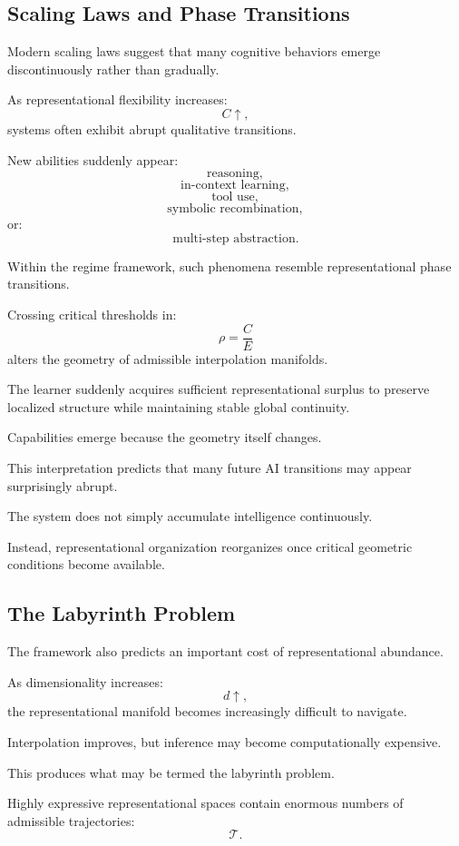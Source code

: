 \documentclass[12pt,a4paper]{article}
\begin{document}
\subsection{Scaling Laws and Phase Transitions}

Modern scaling laws suggest that many cognitive behaviors emerge discontinuously rather than gradually.

As representational flexibility increases:
\[
C
\uparrow,
\]
systems often exhibit abrupt qualitative transitions.

New abilities suddenly appear:
\[
\text{reasoning},
\]
\[
\text{in-context learning},
\]
\[
\text{tool use},
\]
\[
\text{symbolic recombination},
\]
or:
\[
\text{multi-step abstraction}.
\]

Within the regime framework, such phenomena resemble representational phase transitions.

Crossing critical thresholds in:
\[
\rho
=
\frac{C}{E}
\]
alters the geometry of admissible interpolation manifolds.

The learner suddenly acquires sufficient representational surplus to preserve localized structure while maintaining stable global continuity.

Capabilities emerge because the geometry itself changes.

This interpretation predicts that many future AI transitions may appear surprisingly abrupt.

The system does not simply accumulate intelligence continuously.

Instead, representational organization reorganizes once critical geometric conditions become available.

\subsection{The Labyrinth Problem}

The framework also predicts an important cost of representational abundance.

As dimensionality increases:
\[
d
\uparrow,
\]
the representational manifold becomes increasingly difficult to navigate.

Interpolation improves, but inference may become computationally expensive.

This produces what may be termed the labyrinth problem.

Highly expressive representational spaces contain enormous numbers of admissible trajectories:
\[
\mathcal{T}.
\]
\end{document}
